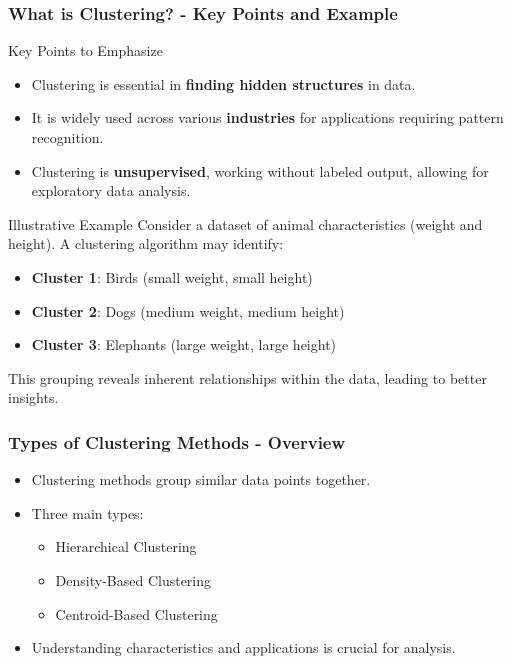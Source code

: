 \documentclass{beamer}
\begin{document}
\begin{frame}[fragile]
    \frametitle{What is Clustering? - Key Points and Example}
    \begin{block}{Key Points to Emphasize}
        \begin{itemize}
            \item Clustering is essential in \textbf{finding hidden structures} in data.
            \item It is widely used across various \textbf{industries} for applications requiring pattern recognition.
            \item Clustering is \textbf{unsupervised}, working without labeled output, allowing for exploratory data analysis.
        \end{itemize}
    \end{block}

    \begin{block}{Illustrative Example}
        Consider a dataset of animal characteristics (weight and height). A clustering algorithm may identify:
        \begin{itemize}
            \item \textbf{Cluster 1}: Birds (small weight, small height)
            \item \textbf{Cluster 2}: Dogs (medium weight, medium height)
            \item \textbf{Cluster 3}: Elephants (large weight, large height)
        \end{itemize}
        This grouping reveals inherent relationships within the data, leading to better insights.
    \end{block}
\end{frame}

\begin{frame}[fragile]
    \frametitle{Types of Clustering Methods - Overview}
    \begin{itemize}
        \item Clustering methods group similar data points together.
        \item Three main types:
        \begin{itemize}
            \item Hierarchical Clustering
            \item Density-Based Clustering
            \item Centroid-Based Clustering
        \end{itemize}
        \item Understanding characteristics and applications is crucial for analysis.
    \end{itemize}
\end{frame}
\end{document}
